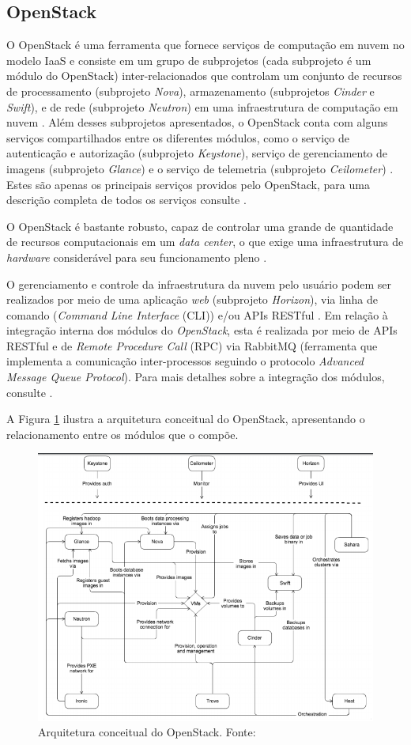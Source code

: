 \documentclass[conference]{IEEEtran}
\begin{document}
\subsection{OpenStack}

O OpenStack é uma ferramenta que fornece serviços de computação em nuvem no modelo IaaS e consiste em um grupo de subprojetos (cada subprojeto é um módulo 
do OpenStack) inter-relacionados 
que controlam um conjunto de recursos de processamento (subprojeto \textit{Nova}), armazenamento (subprojetos \textit{Cinder} e \textit{Swift}),
e de rede (subprojeto \textit{Neutron}) em uma infraestrutura de computação em nuvem \cite{openstack} \cite{bui2016}.
Além desses subprojetos apresentados, o OpenStack conta com alguns serviços compartilhados entre os diferentes módulos, como o serviço de 
autenticação e autorização (subprojeto \textit{Keystone}), serviço de gerenciamento de imagens (subprojeto \textit{Glance}) e o serviço de 
telemetria (subprojeto \textit{Ceilometer}) \cite{openstack}. Estes são apenas os principais serviços providos pelo OpenStack, para uma
descrição completa de todos os serviços consulte \cite{openstack}.

O OpenStack é bastante robusto, capaz de controlar uma grande de quantidade
de recursos computacionais em um \textit{data center}, o que exige uma infraestrutura de \textit{hardware} 
considerável para seu funcionamento pleno \cite{openstack_general} \cite{openstack}.

O gerenciamento e controle da infraestrutura da nuvem pelo usuário podem ser realizados por meio de uma aplicação \textit{web}
(subprojeto \textit{Horizon}), via linha de comando (\textit{Command Line Interface} (CLI)) e/ou APIs RESTful \cite{bui2016} \cite{openstack}.
Em relação à integração interna dos módulos do \textit{OpenStack}, esta é realizada por meio de APIs RESTful e 
de \textit{Remote Procedure Call} (RPC) via RabbitMQ (ferramenta que implementa a comunicação inter-processos seguindo o protocolo
\textit{Advanced Message Queue Protocol})\cite{bui2016}. Para mais detalhes sobre a integração dos módulos, consulte \cite{bui2016}.

A Figura \ref{fig:openstack_architecture} ilustra a arquitetura conceitual do OpenStack, apresentando o relacionamento entre os
módulos que o compõe.

\begin{figure}[ht]
\centering
\includegraphics[width=.5\textwidth]{figuras/openstack_architecture.png}
\caption{Arquitetura conceitual do OpenStack. Fonte: \cite{openstack}}
\label{fig:openstack_architecture}
\end{figure}
\end{document}
